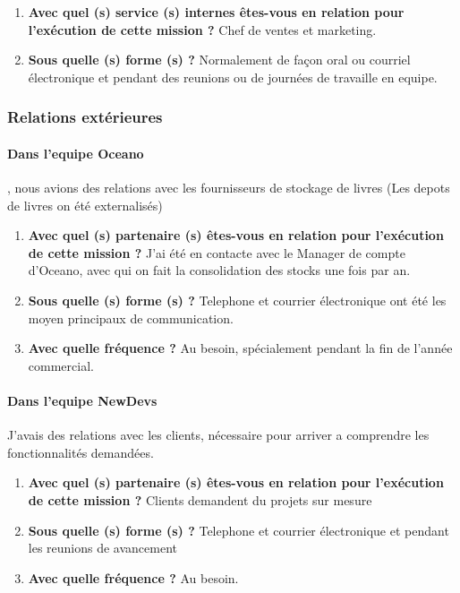 \documentclass{resume} %
\begin{document}
		\begin{enumerate}
		\item \textbf{ Avec quel (s) service (s) internes êtes-vous en relation pour l'exécution de cette mission ?}
			Chef de ventes et marketing. 
		\item \textbf{Sous quelle (s) forme (s) ?}
			Normalement de façon oral ou courriel électronique et pendant des reunions ou de journées de travaille en equipe. 
		\end {enumerate}

	
	\subsubsection{Relations extérieures} 
		\paragraph{Dans l'equipe Oceano}, nous avions des relations avec les fournisseurs de stockage de livres (Les depots de livres on été externalisés)
		\begin{enumerate}
		\item \textbf{Avec quel (s) partenaire (s) êtes-vous en relation pour l'exécution de cette mission ?}
			J'ai été en contacte avec le Manager de compte d'Oceano, avec qui on fait la consolidation des stocks une fois par an.
		\item \textbf{ Sous quelle (s) forme (s) ?}
			Telephone et courrier électronique ont été les moyen principaux de communication. 
		\item \textbf{ Avec quelle fréquence ?}
			Au besoin, spécialement pendant la fin de l'année commercial.
		\end {enumerate}			
		
		\paragraph{Dans l'equipe NewDevs} J'avais des relations avec les clients, nécessaire pour arriver a comprendre les fonctionnalités demandées.   
		\begin{enumerate}
		\item \textbf{Avec quel (s) partenaire (s) êtes-vous en relation pour l'exécution de cette mission ?}
			Clients demandent du projets sur mesure 
		\item \textbf{ Sous quelle (s) forme (s) ?}
			Telephone et courrier électronique et pendant les reunions de avancement 
		\item \textbf{ Avec quelle fréquence ?}
			Au besoin.
		\end {enumerate}			
		
\end{document}

